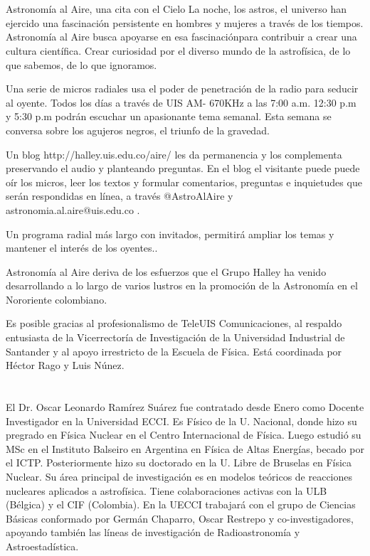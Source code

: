 \documentclass{book}
\begin{document}
\section*{}


Astronomía al Aire, una cita con el Cielo
La noche, los astros, el universo han ejercido una fascinación persistente en hombres y mujeres a través de los tiempos.
Astronomía al Aire busca apoyarse en esa fascinaciónpara contribuir a crear una cultura científica. Crear curiosidad por el diverso mundo
de la astrofísica, de lo que sabemos, de lo que ignoramos.

Una serie de micros radiales usa el poder de penetración de la radio para seducir al oyente.  Todos los días a través de  UIS AM- 670KHz a las 7:00 a.m. 12:30 p.m y 5:30 p.m podrán escuchar un apasionante tema semanal. Esta semana se conversa sobre los agujeros negros, el triunfo de la gravedad.

Un blog http://halley.uis.edu.co/aire/ les da permanencia y los complementa preservando el audio y planteando preguntas.  En el blog el visitante puede puede oír los micros, leer los textos y formular comentarios, preguntas e inquietudes que serán respondidas en línea, a través @AstroAlAire y astronomia.al.aire@uis.edu.co .


Un programa radial más largo con invitados, permitirá ampliar los temas y mantener el interés de los oyentes..

Astronomía al Aire deriva de los esfuerzos que el Grupo Halley ha venido desarrollando a lo largo de varios lustros en la promoción de la Astronomía
en el Nororiente colombiano.

Es posible gracias al profesionalismo de TeleUIS Comunicaciones, al respaldo entusiasta de la Vicerrectoría de Investigación de la Universidad Industrial de Santander y al apoyo irrestricto de la Escuela de Física. Está coordinada por Héctor Rago y Luis Núnez.

\section*{}

El Dr. Oscar Leonardo Ramírez Suárez fue contratado desde Enero como Docente Investigador en la Universidad ECCI. Es Físico de la U. Nacional, donde hizo su pregrado en Física Nuclear en el Centro Internacional de Física. Luego estudió su MSc en el Instituto Balseiro en Argentina en Física de Altas Energías, becado por el ICTP. Posteriormente hizo su doctorado en la U. Libre de Bruselas en Física Nuclear. Su área principal de investigación es en modelos teóricos de reacciones nucleares aplicados a astrofísica. Tiene colaboraciones activas con la ULB (Bélgica) y el CIF (Colombia). En la UECCI trabajará con el grupo de Ciencias Básicas conformado por Germán Chaparro, Oscar Restrepo y co-investigadores, apoyando también las líneas de investigación de Radioastronomía y Astroestadística.
\end{document}
